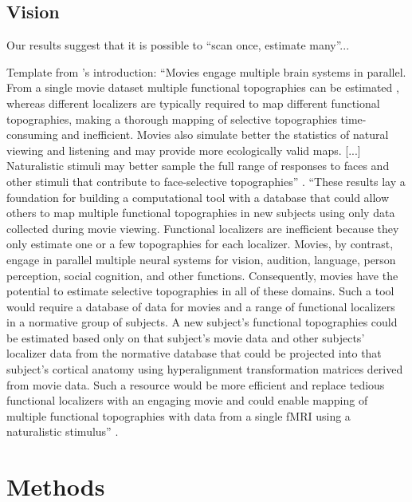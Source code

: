 \subsection{Vision}



Our results suggest that it is possible to ``scan once, estimate many''...

%
Template from \citet{jiahui2020predicting}'s introduction: ``Movies engage
multiple brain systems in parallel. From a single movie dataset multiple
functional topographies can be estimated \citep{guntupalli2016model}, whereas
different localizers are typically required to map different functional
topographies, making a thorough mapping of selective topographies time-consuming
and inefficient. Movies also simulate better the statistics of natural viewing
and listening and may provide more ecologically valid maps. [...] Naturalistic
stimuli may better sample the full range of responses to faces and other stimuli
that contribute to face-selective topographies'' \citep{jiahui2020predicting}.
%
``These results lay a foundation for building a computational tool with a
database that could allow others to map multiple functional topographies in new
subjects using only data collected during movie viewing. Functional localizers
are inefficient because they only estimate one or a few topographies for each
localizer. Movies, by contrast, engage in parallel multiple neural systems for
vision, audition, language, person perception, social cognition, and other
functions. Consequently, movies have the potential to estimate selective
topographies in all of these domains. Such a tool would require a database of
data for movies and a range of functional localizers in a normative group of
subjects. A new subject's functional topographies could be estimated based only
on that subject's movie data and other subjects' localizer data from the
normative database that could be projected into that subject's cortical anatomy
using hyperalignment transformation matrices derived from movie data. Such a
resource would be more efficient and replace tedious functional localizers with
an engaging movie and could enable mapping of multiple functional topographies
with data from a single fMRI using a naturalistic stimulus''
\citet{jiahui2020predicting}.


\section{Methods}

